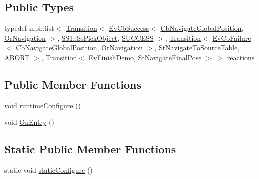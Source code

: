 \subsection*{Public Types}
\begin{DoxyCompactItemize}
\item 
typedef mpl\+::list$<$ \hyperlink{classsmacc_1_1Transition}{Transition}$<$ \hyperlink{structsmacc_1_1EvCbSuccess}{Ev\+Cb\+Success}$<$ \hyperlink{classcl__move__base__z_1_1CbNavigateGlobalPosition}{Cb\+Navigate\+Global\+Position}, \hyperlink{classsm__fetch__six__table__pick__n__sort__1_1_1OrNavigation}{Or\+Navigation} $>$, \hyperlink{structsm__fetch__six__table__pick__n__sort__1_1_1SS1_1_1SsPickObject}{S\+S1\+::\+Ss\+Pick\+Object}, \hyperlink{structsmacc_1_1default__transition__tags_1_1SUCCESS}{S\+U\+C\+C\+E\+SS} $>$, \hyperlink{classsmacc_1_1Transition}{Transition}$<$ \hyperlink{structsmacc_1_1EvCbFailure}{Ev\+Cb\+Failure}$<$ \hyperlink{classcl__move__base__z_1_1CbNavigateGlobalPosition}{Cb\+Navigate\+Global\+Position}, \hyperlink{classsm__fetch__six__table__pick__n__sort__1_1_1OrNavigation}{Or\+Navigation} $>$, \hyperlink{structsm__fetch__six__table__pick__n__sort__1_1_1StNavigateToSourceTable}{St\+Navigate\+To\+Source\+Table}, \hyperlink{structsmacc_1_1default__transition__tags_1_1ABORT}{A\+B\+O\+RT} $>$, \hyperlink{classsmacc_1_1Transition}{Transition}$<$ \hyperlink{structsm__fetch__six__table__pick__n__sort__1_1_1EvFinishDemo}{Ev\+Finish\+Demo}, \hyperlink{structsm__fetch__six__table__pick__n__sort__1_1_1StNavigateFinalPose}{St\+Navigate\+Final\+Pose} $>$ $>$ \hyperlink{structsm__fetch__six__table__pick__n__sort__1_1_1StNavigateToSourceTable_a491e024c3ceebcf81d035323b1edc32b}{reactions}
\end{DoxyCompactItemize}
\subsection*{Public Member Functions}
\begin{DoxyCompactItemize}
\item 
void \hyperlink{structsm__fetch__six__table__pick__n__sort__1_1_1StNavigateToSourceTable_a1e4b8cd70fbb88d5c42ebfdc48a9122f}{runtime\+Configure} ()
\item 
void \hyperlink{structsm__fetch__six__table__pick__n__sort__1_1_1StNavigateToSourceTable_aff505f7bdc92511e1fce3c703c7165a4}{On\+Entry} ()
\end{DoxyCompactItemize}
\subsection*{Static Public Member Functions}
\begin{DoxyCompactItemize}
\item 
static void \hyperlink{structsm__fetch__six__table__pick__n__sort__1_1_1StNavigateToSourceTable_a836a8ec737b708629633afb0655b3920}{static\+Configure} ()
\end{DoxyCompactItemize}
